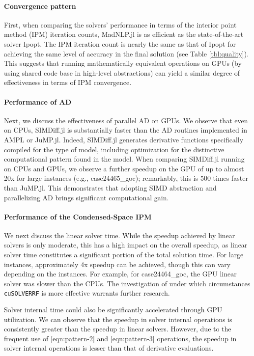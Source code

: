 \paragraph*{Convergence pattern}
First, when comparing the solvers' performance in terms of the
interior point method (IPM) iteration counts, MadNLP.jl is as
efficient as the state-of-the-art solver Ipopt. The IPM iteration
count is nearly the same as that of Ipopt for achieving the same level
of accuracy in the final solution (see Table \ref{tbl:quality}). This
suggests that running mathematically equivalent operations on GPUs (by
using shared code base in high-level abstractions) can yield a similar
degree of effectiveness in terms of IPM convergence.

\paragraph*{Performance of AD}
Next, we discuss the effectiveness of parallel AD on GPUs. We observe
that even on CPUs, SIMDiff.jl is substantially faster than the AD
routines implemented in AMPL or JuMP.jl. Indeed, SIMDiff.jl generates
derivative functions specifically compiled for the type of model,
including optimization for the distinctive computational pattern found
in the model. When comparing SIMDiff.jl running on CPUs and GPUs, we
observe a further speedup on the GPU of up to almost 20x for large
instances (e.g., case24465\_goc); remarkably, this is 500 times faster
than JuMP.jl. This demonstrates that adopting SIMD abstraction and
parallelizing AD brings significant computational gain. 

\paragraph*{Performance of the Condensed-Space IPM}
We next discuss the linear solver time. While the speedup achieved by
linear solvers is only moderate, this has a high impact on the overall
speedup, as linear solver time constitutes a significant portion of
the total solution time. For large instances, approximately 4x speedup
can be achieved, though this can vary depending on the instances. For
example, for case24464\_goc, the GPU linear solver was slower than the
CPUs. The investigation of under which circumstances {\tt cuSOLVERRF} is
more effective warrants further research.

Solver internal time could also be significantly accelerated through
GPU utilization. We can observe that the speedup in solver internal
operations is consistently greater than the speedup in linear
solvers. However, due to the frequent use of \ref{eqn:pattern-2} and
\ref{eqn:pattern-3} operations, the speedup in solver internal
operations is lesser than that of derivative evaluations.

